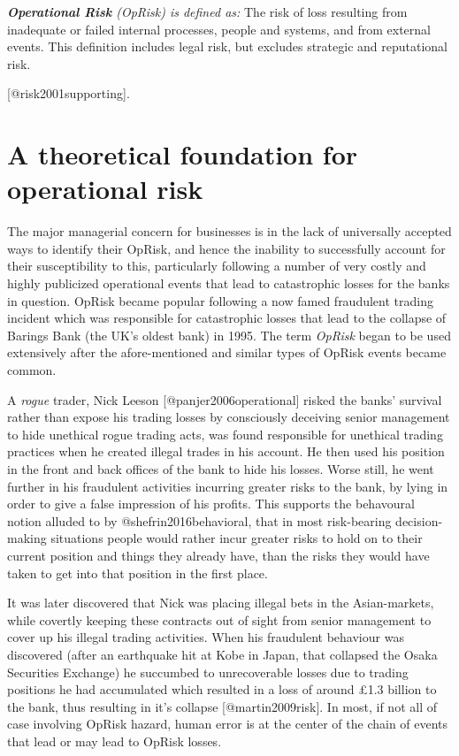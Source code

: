 \documentclass[
]{article}
\begin{document}
\begin{definition}
\emph{\textbf{Operational Risk} (OpRisk) is defined as:} The risk of loss resulting from inadequate or failed internal processes, people and systems, and from external events. This definition includes legal risk, but excludes strategic and reputational risk.\medskip
\end{definition}

{[}@risk2001supporting{]}.

\section{A theoretical foundation for operational risk}
\label{sec:A theoretical foundation for operational risk}

The major managerial concern for businesses is in the lack of
universally accepted ways to identify their OpRisk, and hence the
inability to successfully account for their susceptibility to this,
particularly following a number of very costly and highly publicized
operational events that lead to catastrophic losses for the banks in
question. OpRisk became popular following a now famed fraudulent trading
incident which was responsible for catastrophic losses that lead to the
collapse of Barings Bank (the UK's oldest bank) in 1995. The term
\emph{OpRisk} began to be used extensively after the afore-mentioned and
similar types of OpRisk events became common.\medskip

A \emph{rogue} trader, Nick Leeson {[}@panjer2006operational{]} risked
the banks' survival rather than expose his trading losses by consciously
deceiving senior management to hide unethical rogue trading acts, was
found responsible for unethical trading practices when he created
illegal trades in his account. He then used his position in the front
and back offices of the bank to hide his losses. Worse still, he went
further in his fraudulent activities incurring greater risks to the
bank, by lying in order to give a false impression of his profits. This
supports the behavoural notion alluded to by @shefrin2016behavioral,
that in most risk-bearing decision-making situations people would rather
incur greater risks to hold on to their current position and things they
already have, than the risks they would have taken to get into that
position in the first place.\medskip

It was later discovered that Nick was placing illegal bets in the
Asian-markets, while covertly keeping these contracts out of sight from
senior management to cover up his illegal trading activities. When his
fraudulent behaviour was discovered (after an earthquake hit at Kobe in
Japan, that collapsed the Osaka Securities Exchange) he succumbed to
unrecoverable losses due to trading positions he had accumulated which
resulted in a loss of around \pounds 1.3 billion to the bank, thus
resulting in it's collapse {[}@martin2009risk{]}. In most, if not all of
case involving OpRisk hazard, human error is at the center of the chain
of events that lead or may lead to OpRisk losses.\medskip
\end{document}
